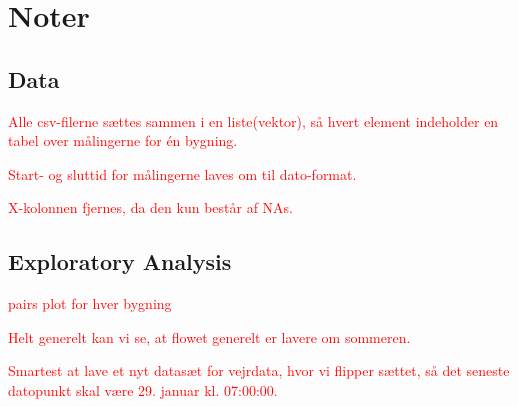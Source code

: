 \chapter{Noter}

\section{Data}
\textcolor{red}{Alle csv-filerne sættes sammen i en liste(vektor), så hvert element indeholder en tabel over målingerne for én bygning.}

\textcolor{red}{Start- og sluttid for målingerne laves om til dato-format.}

\textcolor{red}{X-kolonnen fjernes, da den kun består af NAs.}


\section{Exploratory Analysis}
\textcolor{red}{pairs plot for hver bygning}

\textcolor{red}{Helt generelt kan vi se, at flowet generelt er lavere om sommeren.}

\textcolor{red}{Smartest at lave et nyt datasæt for vejrdata, hvor vi flipper sættet, så det seneste datopunkt skal være 29. januar kl. 07:00:00.}